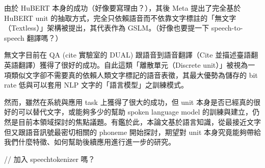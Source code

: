 由於 HuBERT 本身的成功（好像要寫理由？），其後 Meta 提出了完全基於 HuBERT unit 的抽取方式，完全只依賴語音而不依靠文字標註的「無文字（Textless）」架構被提出，其代表作為 GSLM。（好像也要提一下 speech-to-speech 翻譯嗎？）

無文字目前在 QA (cite 實驗室的 DUAL) 跟語音到語音翻譯（Cite 並描述臺語翻英語翻譯）獲得了很好的成功。自此這類「離散單元（Discrete unit）」被視為一項類似文字卻不需要真的依賴人類文字標記的語音表徵，其最大優勢為儲存的 bit rate 低與可以套用 NLP 文字的「語言模型」之訓練模式。

然而，雖然在系統與應用 task 上獲得了很大的成功，但 unit 本身是否已經真的很好的可以替代文字，或能夠多少的幫助 spoken language model 的訓練與建立，仍然是目前本領域探討的焦點議題。有鑑於此，本論文基於語言知識，從最接近文字但又跟語音訊號最密切相關的 phoneme 開始探討，期望對 unit 本身究竟能夠帶給我們什麼特徵、如何幫助後續應用進行進一步的研究。

// 加入 speechtokenizer 嗎？

